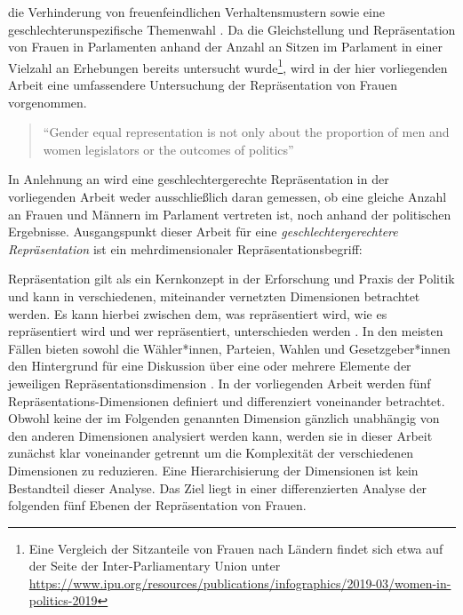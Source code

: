 \documentclass[12pt, 
    twoside=false, 
    bibliography=totoc, 
    numbers=endperiod, 
    headings=normal, 
    toc=chapterentrydotfill
    ]{scrbook}
\begin{document}
die Verhinderung von freuenfeindlichen Verhaltensmustern sowie eine geschlechterunspezifische Themenwahl . Da die Gleichstellung und Repräsentation von Frauen in Parlamenten anhand der Anzahl an Sitzen im Parlament in einer Vielzahl an Erhebungen bereits untersucht wurde\footnote{Eine Vergleich der Sitzanteile von Frauen nach Ländern findet sich etwa auf der Seite der Inter-Parliamentary Union unter \url{https://www.ipu.org/resources/publications/infographics/2019-03/women-in-politics-2019}}, wird in der hier vorliegenden Arbeit eine umfassendere Untersuchung der Repräsentation von Frauen vorgenommen. 

\citereset
\begin{quote}
     \enquote{Gender equal representation is not only about the proportion of men and women legislators or the outcomes of politics}\parencite[197]{erikson_2018}
 \end{quote}

In Anlehnung an \textcite{erikson_2018} wird eine geschlechtergerechte Repräsentation in der vorliegenden Arbeit weder ausschließlich daran gemessen, ob eine gleiche Anzahl an Frauen und Männern im Parlament vertreten ist, noch anhand der politischen Ergebnisse. Ausgangspunkt dieser Arbeit für eine \emph{geschlechtergerechtere Repräsentation} ist ein mehrdimensionaler Repräsentationsbegriff:

Repräsentation gilt als ein Kernkonzept in der Erforschung und Praxis der Politik und kann in verschiedenen, miteinander vernetzten Dimensionen betrachtet werden. Es kann hierbei zwischen dem, was repräsentiert wird, wie es repräsentiert wird und wer repräsentiert, unterschieden werden \parencite[557]{galligan_2007}. In den meisten Fällen bieten sowohl die Wähler*innen, Parteien, Wahlen und Gesetzgeber*innen den Hintergrund für eine Diskussion über eine oder mehrere Elemente der jeweiligen Repräsentationsdimension \parencite[557]{galligan_2007}.
In der vorliegenden Arbeit werden fünf Repräsentations-Dimensionen definiert und differenziert voneinander betrachtet. Obwohl keine der im Folgenden genannten Dimension gänzlich unabhängig von den anderen Dimensionen analysiert werden kann, werden sie in dieser Arbeit zunächst klar voneinander getrennt um die Komplexität der verschiedenen Dimensionen zu reduzieren. Eine Hierarchisierung der Dimensionen ist kein Bestandteil dieser Analyse. Das Ziel liegt in einer differenzierten Analyse der folgenden fünf Ebenen der Repräsentation von Frauen.
\end{document}
